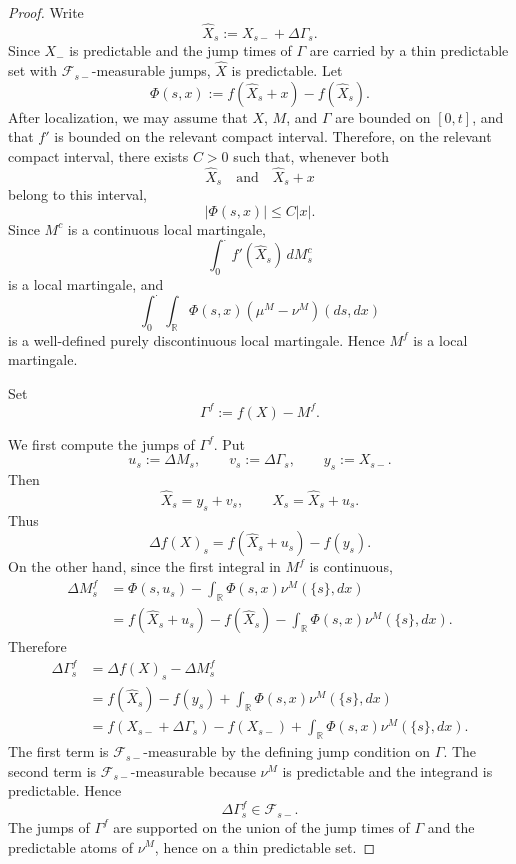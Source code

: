 \documentclass[a4paper,10pt]{article}
\begin{document}
\begin{proof}
Write
\[
        \widehat X_s:=X_{s-}+\Delta\Gamma_s.
\]
Since \(X_{-}\) is predictable and the jump times of \(\Gamma\) are carried by
a thin predictable set with \(\mathcal F_{s-}\)-measurable jumps,
\(\widehat X\) is predictable. Let
\[
        \Phi(s,x):=f(\widehat X_s+x)-f(\widehat X_s).
\]
After localization, we may assume that \(X\), \(M\), and \(\Gamma\) are
bounded on \([0,t]\), and that \(f'\) is bounded on the relevant compact
interval. Therefore, on the relevant compact interval, there exists
\(C>0\) such that, whenever both
\[
        \widehat X_s
        \quad\text{and}\quad
        \widehat X_s+x
\]
belong to this interval,
\[
        |\Phi(s,x)|
        \le C|x|.
\] 
Since \(M^c\) is a
continuous local martingale,
\[
        \int_0^\cdot f'(\widehat X_s)\,dM^c_s
\]
is a local martingale, and
\[
        \int_0^\cdot\int_{\mathbb R}
        \Phi(s,x)(\mu^M-\nu^M)(ds,dx)
\]
is a well-defined purely discontinuous local martingale. Hence \(M^f\)
is a local martingale.

Set
\[
        \Gamma^f:=f(X)-M^f.
\]

We first compute the jumps of \(\Gamma^f\). Put
\[
        u_s:=\Delta M_s,
        \qquad
        v_s:=\Delta\Gamma_s,
        \qquad
        y_s:=X_{s-}.
\]
Then
\[
        \widehat X_s=y_s+v_s,
        \qquad
        X_s=\widehat X_s+u_s.
\]
Thus
\[
        \Delta f(X)_s
        =
        f(\widehat X_s+u_s)-f(y_s).
\]
On the other hand, since the first integral in \(M^f\) is continuous,
\[
\begin{aligned}
\Delta M^f_s
&=
        \Phi(s,u_s)
        -
        \int_{\mathbb R}\Phi(s,x)\nu^M(\{s\},dx)
\\
&=
        f(\widehat X_s+u_s)-f(\widehat X_s)
        -
        \int_{\mathbb R}\Phi(s,x)\nu^M(\{s\},dx).
\end{aligned}
\]
Therefore
\[
\begin{aligned}
\Delta\Gamma^f_s
&=
        \Delta f(X)_s-\Delta M^f_s
\\
&=
        f(\widehat X_s)-f(y_s)
        +
        \int_{\mathbb R}\Phi(s,x)\nu^M(\{s\},dx)
\\
&=
        f(X_{s-}+\Delta\Gamma_s)-f(X_{s-})
        +
        \int_{\mathbb R}
        \Phi(s,x)\nu^M(\{s\},dx).
\end{aligned}
\]
The first term is \(\mathcal F_{s-}\)-measurable by the defining jump
condition on \(\Gamma\). The second term is \(\mathcal F_{s-}\)-measurable
because \(\nu^M\) is predictable and the integrand is predictable. Hence
\[
        \Delta\Gamma^f_s\in\mathcal F_{s-}.
\]
The jumps of \(\Gamma^f\) are supported on the union of the jump times of
\(\Gamma\) and the predictable atoms of \(\nu^M\), hence on a thin
predictable set.


\end{proof}
\end{document}
